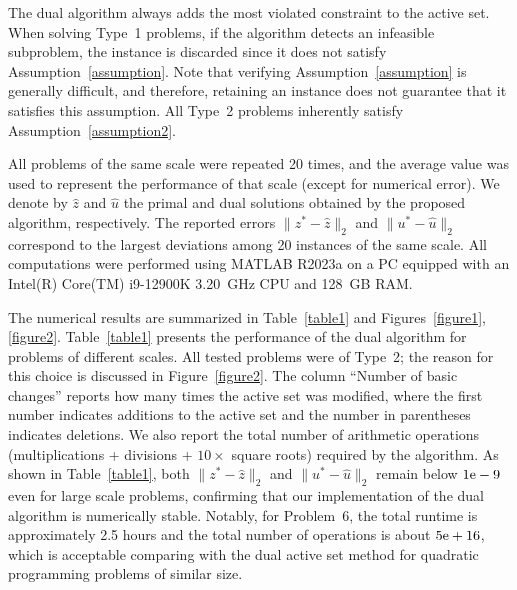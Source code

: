 \documentclass{article}
\begin{document}
	The dual algorithm always adds the most violated constraint to the active set. When solving Type~1 problems, if the algorithm detects an infeasible subproblem, the instance is discarded since it does not satisfy Assumption~\ref{assumption}. Note that verifying Assumption~\ref{assumption} is generally difficult, and therefore, retaining an instance does not guarantee that it satisfies this assumption. All Type~2 problems inherently satisfy Assumption~\ref{assumption2}.
	
	All problems of the same scale were repeated 20 times, and the average value was used to represent the performance of that scale (except for numerical error). We denote by $\hat{z}$ and $\hat{u}$ the primal and dual solutions obtained by the proposed algorithm, respectively. The reported errors $\|z^{\ast} - \hat{z}\|_{2}$ and $\|u^{\ast} - \hat{u}\|_{2}$ correspond to the largest deviations among 20 instances of the same scale. All computations were performed using \textsc{MATLAB} R2023a on a PC equipped with an Intel(R) Core(TM) i9-12900K 3.20~GHz CPU and 128~GB RAM.
 
	The numerical results are summarized in Table~\ref{table1} and Figures~\ref{figure1},\ref{figure2}. Table~\ref{table1} presents the performance of the dual algorithm for problems of different scales. All tested problems were of Type~2; the reason for this choice is discussed in Figure~\ref{figure2}. The column “Number of basic changes” reports how many times the active set was modified, where the first number indicates additions to the active set and the number in parentheses indicates deletions. We also report the total number of arithmetic operations (multiplications + divisions + $10\times$ square roots) required by the algorithm. As shown in Table~\ref{table1}, both $\|z^{\ast} - \hat{z}\|_{2}$ and $\|u^{\ast} - \hat{u}\|_{2}$ remain below ${\rm 1e-9}$ even for large scale problems, confirming that our implementation of the dual algorithm is numerically stable. Notably, for Problem~6, the total runtime is approximately 2.5 hours and the total number of operations is about ${\rm 5e+16}$, which is acceptable comparing with the dual active set method for quadratic programming problems of similar size.
	
\end{document}
